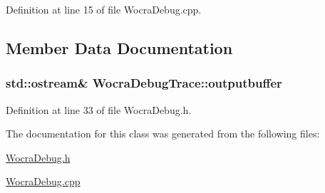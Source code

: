 Definition at line 15 of file Wocra\+Debug.\+cpp.



\subsection{Member Data Documentation}
\subsubsection[{\texorpdfstring{outputbuffer}{outputbuffer}}]{\setlength{\rightskip}{0pt plus 5cm}std\+::ostream\& Wocra\+Debug\+Trace\+::outputbuffer}\hypertarget{classWocraDebugTrace_a948a5a59a058ea25a076da759b621852}{}\label{classWocraDebugTrace_a948a5a59a058ea25a076da759b621852}


Definition at line 33 of file Wocra\+Debug.\+h.



The documentation for this class was generated from the following files\+:\begin{DoxyCompactItemize}
\item 
\hyperlink{WocraDebug_8h}{Wocra\+Debug.\+h}\item 
\hyperlink{WocraDebug_8cpp}{Wocra\+Debug.\+cpp}\end{DoxyCompactItemize}

